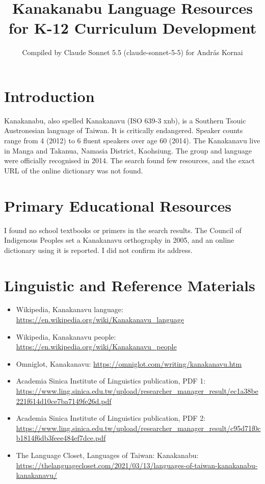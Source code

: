 \documentclass[12pt]{article}
\title{Kanakanabu Language Resources for K-12 Curriculum Development}
\author{Compiled by Claude Sonnet 5.5 (claude-sonnet-5-5) for Andr\'as Kornai}
\date{}
\begin{document}
\maketitle

\section{Introduction}
Kanakanabu, also spelled Kanakanavu (ISO 639-3 xnb), is a Southern Tsouic Austronesian language of Taiwan. It is critically endangered. Speaker counts range from 4 (2012) to 6 fluent speakers over age 60 (2014). The Kanakanavu live in Manga and Takanua, Namasia District, Kaohsiung. The group and language were officially recognised in 2014. The search found few resources, and the exact URL of the online dictionary was not found.

\section{Primary Educational Resources}
I found no school textbooks or primers in the search results. The Council of Indigenous Peoples set a Kanakanavu orthography in 2005, and an online dictionary using it is reported. I did not confirm its address.

\section{Linguistic and Reference Materials}
\begin{itemize}
\item Wikipedia, Kanakanavu language: \url{https://en.wikipedia.org/wiki/Kanakanavu_language}
\item Wikipedia, Kanakanavu people: \url{https://en.wikipedia.org/wiki/Kanakanavu_people}
\item Omniglot, Kanakanavu: \url{https://omniglot.com/writing/kanakanavu.htm}
\item Academia Sinica Institute of Linguistics publication, PDF 1: \url{https://www.ling.sinica.edu.tw/upload/researcher_manager_result/ec1a38be221f614d10ce7ba7149fe26d.pdf}
\item Academia Sinica Institute of Linguistics publication, PDF 2: \url{https://www.ling.sinica.edu.tw/upload/researcher_manager_result/c95d71f0cb1814f6db3feee484ef7dce.pdf}
\item The Language Closet, Languages of Taiwan: Kanakanabu: \url{https://thelanguagecloset.com/2021/03/13/languages-of-taiwan-kanakanabu-kanakanavu/}
\end{itemize}
\end{document}
